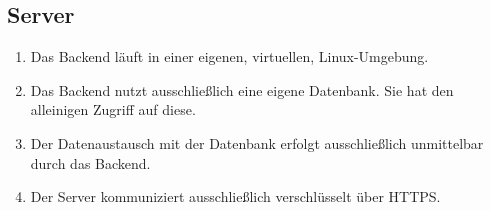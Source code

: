 \subsection{Server}

\begin{enumerate}
    \item Das Backend läuft in einer eigenen, virtuellen, Linux-Umgebung.
    \item Das Backend nutzt ausschließlich eine eigene Datenbank. Sie hat den alleinigen Zugriff auf diese.
    \item Der Datenaustausch mit der Datenbank erfolgt ausschließlich unmittelbar durch das Backend.
    \item Der Server kommuniziert ausschließlich verschlüsselt über HTTPS.
\end{enumerate}